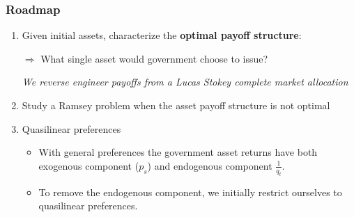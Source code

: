 \documentclass{beamer}
\begin{document}
\begin{frame}
\frametitle{Roadmap}
	\begin{enumerate}
	
		\item  Given initial assets, characterize the \textbf{optimal payoff structure}:
		
		$\Rightarrow$ What single asset would  government choose to issue?
		
 		 \emph{We reverse engineer payoffs from a Lucas Stokey complete market allocation}

			
		
		\item Study a Ramsey problem when the asset payoff structure is not optimal
		\item Quasilinear preferences
	\begin{itemize}		
		\item  With general preferences the government asset returns have both exogenous component ($p_s$) and endogenous component $\frac{1}{q_t}$.
		\item  To remove the endogenous component, we initially restrict ourselves to  quasilinear preferences.
	\end{itemize}
\end{enumerate}
\end{frame}
\end{document}
